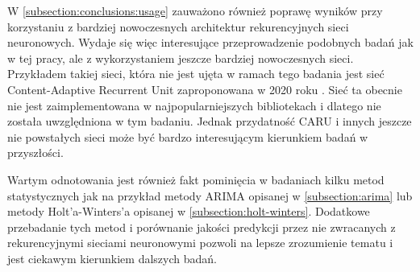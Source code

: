 \documentclass[10pt,a4paper]{article}
\begin{document}
W \autoref{subsection:conclusions:usage} zauważono również poprawę wyników przy korzystaniu z bardziej nowoczesnych architektur rekurencyjnych sieci neuronowych. Wydaje się więc interesujące przeprowadzenie podobnych badań jak w tej pracy, ale z wykorzystaniem jeszcze bardziej nowoczesnych sieci. Przykładem takiej sieci, która nie jest ujęta w ramach tego badania jest sieć Content-Adaptive Recurrent Unit zaproponowana w 2020 roku \cite{chan2020caru}. Sieć ta obecnie nie jest zaimplementowana w najpopularniejszych bibliotekach i dlatego nie została uwzględniona w tym badaniu. Jednak przydatność CARU i innych jeszcze nie powstałych sieci może być bardzo interesującym kierunkiem badań w przyszłości. 

Wartym odnotowania jest również fakt pominięcia w badaniach kilku metod statystycznych jak na przykład metody ARIMA opisanej w \autoref{subsection:arima} lub metody Holt'a-Winters'a opisanej w \autoref{subsection:holt-winters}. Dodatkowe przebadanie tych metod i porównanie jakości predykcji przez nie zwracanych z rekurencyjnymi sieciami neuronowymi pozwoli na lepsze zrozumienie tematu i jest ciekawym kierunkiem dalszych badań. 

\newpage
\printbibliography[title=Bibliografia]
\end{document}
